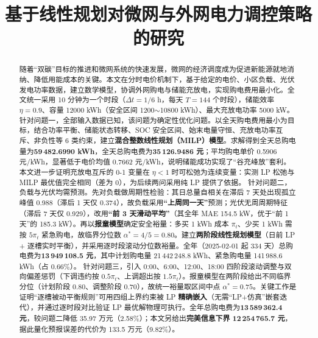 \documentclass{cumcmthesis}
\title{基于线性规划对微网与外网电力调控策略的研究}
\begin{document}
\maketitle

\begin{abstract}
    随着“双碳”目标的推进和微网系统的快速发展，微网的经济调度成为促进新能源就地消纳、降低用能成本的关键。本文在分时电价机制下，基于给定的电价、小区负载、光伏发电功率数据，建立数学模型，协调外网购电与储能充放电，实现购电费用最小化。全文统一采用 10 分钟为一个时段（$\Delta t=1/6$ h，每天 $T=144$ 个时段），储能效率 $\eta=0.9$、容量 12000 kWh（安全区间 1200$\sim$10800 kWh）、最大充放电功率 5000 kW。\newline \hspace*{2em}
    针对问题一，全部输入数据已知，该问题为确定性优化问题。以全天购电费用最小为目标，结合功率平衡、储能状态转移、SOC 安全区间、始末电量守恒、充放电功率互斥、非负性等 6 类约束，建立\textbf{混合整数线性规划（MILP）模型}。求解得到全天总购电量为\textbf{59\,482.6990 kWh}，全天总购电费为\textbf{35\,126.9486 元}；平均购电单价 0.5906 元/kWh，显著低于电价均值 0.7662 元/kWh，说明储能成功实现了“谷充峰放”套利。本文进一步证明充放电互斥的 0-1 变量在 $\eta<1$ 时可松弛为连续变量：实测 LP 松弛与 MILP 最优值完全相同（差为 0），为后续两问采用纯 LP 提供了依据。\newline \hspace*{2em}
    针对问题二，负载与光伏均需预测。先对负载做周期性检验：其日总量自相关在滞后 7 天处出现孤立峰值 0.988（滞后 1 天仅 0.374），故负载采用\textbf{“上周同一天”}预测；光伏无周周期特征（滞后 7 天仅 0.929），改用\textbf{“前 3 天滑动平均”}（其全年 MAE 154.5 kW，优于“前 1 天”的 185.3 kW）。再以\textbf{报童模型}确定安全裕量：多买 1 kWh 成本 $\pi_t$、少买 1 kWh 需按 $5\pi_t$ 紧急购电，故临界分位数 $\alpha^*=4/5=0.80$。建立\textbf{两阶段线性规划模型}（日前 LP + 逐槽实时平衡），并采用逐时段滚动分位数裕量。全年（2025-02-01 起 334 天）总购电费为\textbf{13\,949\,108.5 元}，其中计划购电量 21\,442\,248.8 kWh、紧急购电量 141\,988.6 kWh（占 0.66\%）。\newline \hspace*{2em}
    针对问题三，引入 0:00、6:00、12:00、18:00 四阶段滚动调整与双向偏差惩罚（下调违约按 $0.5\pi_t$、上调超出按 $1.5\pi_t$）。报童模型在两阶段给出不同临界分位（计划阶段 0.80、调整阶段 0.70），故统一裕量取区间中点 $\alpha^*=0.75$。关键工作是证明“逐槽被动平衡规则”可用四组上界约束被 LP \textbf{精确嵌入}（无需“LP+仿真”嵌套迭代），并通过逐时段对比验证 LP 最优解物理可执行。全年总购电费为\textbf{13\,589\,362.4 元}，较问题二降低 35.97 万元（2.58\%）；本文另给出\textbf{完美信息下界 12\,254\,765.7 元}，据此量化预报误差的代价为 133.5 万元（9.82\%）。\newline \hspace*{2em}

\end{abstract}
\end{document}
